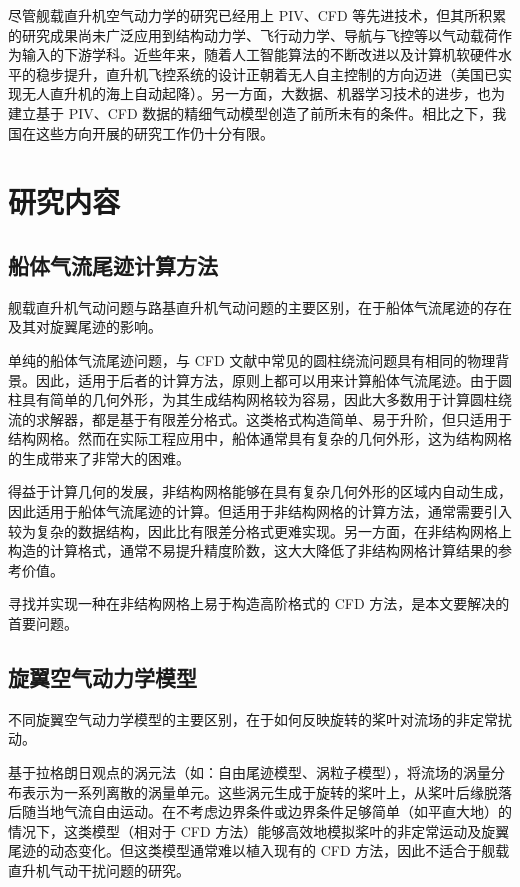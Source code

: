尽管舰载直升机空气动力学的研究已经用上 PIV、CFD 等先进技术，但其所积累的研究成果尚未广泛应用到结构动力学、飞行动力学、导航与飞控等以气动载荷作为输入的下游学科。近些年来，随着人工智能算法的不断改进以及计算机软硬件水平的稳步提升，直升机飞控系统的设计正朝着无人自主控制的方向迈进（美国已实现无人直升机的海上自动起降）。另一方面，大数据、机器学习技术的进步，也为建立基于
PIV、CFD 数据的精细气动模型创造了前所未有的条件。相比之下，我国在这些方向开展的研究工作仍十分有限。

\section{研究内容}

\subsection{船体气流尾迹计算方法}

舰载直升机气动问题与路基直升机气动问题的主要区别，在于船体气流尾迹的存在及其对旋翼尾迹的影响。

单纯的船体气流尾迹问题，与 CFD 文献中常见的圆柱绕流问题具有相同的物理背景。因此，适用于后者的计算方法，原则上都可以用来计算船体气流尾迹。由于圆柱具有简单的几何外形，为其生成结构网格较为容易，因此大多数用于计算圆柱绕流的求解器，都是基于有限差分格式。这类格式构造简单、易于升阶，但只适用于结构网格。然而在实际工程应用中，船体通常具有复杂的几何外形，这为结构网格的生成带来了非常大的困难。

得益于计算几何的发展，非结构网格能够在具有复杂几何外形的区域内自动生成，因此适用于船体气流尾迹的计算。但适用于非结构网格的计算方法，通常需要引入较为复杂的数据结构，因此比有限差分格式更难实现。另一方面，在非结构网格上构造的计算格式，通常不易提升精度阶数，这大大降低了非结构网格计算结果的参考价值。

寻找并实现一种在非结构网格上易于构造高阶格式的 CFD 方法，是本文要解决的首要问题。

\subsection{旋翼空气动力学模型}

不同旋翼空气动力学模型的主要区别，在于如何反映旋转的桨叶对流场的非定常扰动。

基于拉格朗日观点的涡元法（如：自由尾迹模型、涡粒子模型），将流场的涡量分布表示为一系列离散的涡量单元。这些涡元生成于旋转的桨叶上，从桨叶后缘脱落后随当地气流自由运动。在不考虑边界条件或边界条件足够简单（如平直大地）的情况下，这类模型（相对于
CFD 方法）能够高效地模拟桨叶的非定常运动及旋翼尾迹的动态变化。但这类模型通常难以植入现有的 CFD 方法，因此不适合于舰载直升机气动干扰问题的研究。

